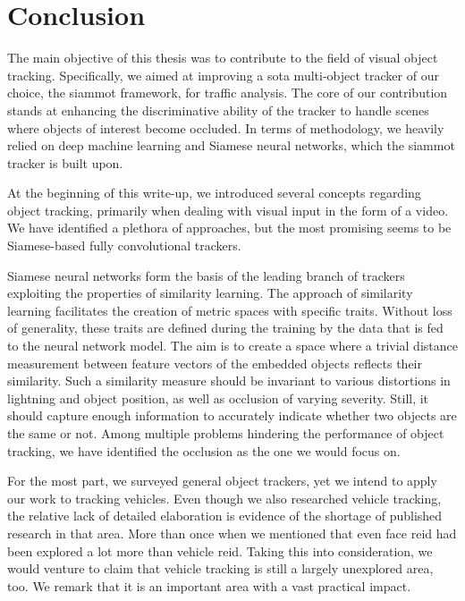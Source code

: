 \chapter{Conclusion}
\label{chap:Conclusion}


The main objective of this thesis was to contribute to the field of visual object tracking. Specifically, we aimed at improving a \gls{sota} multi-object tracker of our choice, the \gls{siammot} framework, for traffic analysis. The core of our contribution stands at enhancing the discriminative ability of the tracker to handle scenes where objects of interest become occluded. In terms of methodology, we heavily relied on deep machine learning and Siamese neural networks, which the \gls{siammot} tracker is built upon.

At the beginning of this write-up, we introduced several concepts regarding object tracking, primarily when dealing with visual input in the form of a video. We have identified a plethora of approaches, but the most promising seems to be Siamese-based fully convolutional trackers.

Siamese neural networks form the basis of the leading branch of trackers exploiting the properties of similarity learning. The approach of similarity learning facilitates the creation of metric spaces with specific traits. Without loss of generality, these traits are defined during the training by the data that is fed to the neural network model. The aim is to create a space where a trivial distance measurement between feature vectors of the embedded objects reflects their similarity. Such a similarity measure should be invariant to various distortions in lightning and object position, as well as occlusion of varying severity. Still, it should capture enough information to accurately indicate whether two objects are the same or not. Among multiple problems hindering the performance of object tracking, we have identified the occlusion as the one we would focus on.

For the most part, we surveyed general object trackers, yet we intend to apply our work to tracking vehicles. Even though we also researched vehicle tracking, the relative lack of detailed elaboration is evidence of the shortage of published research in that area. More than once when we mentioned that even face \gls{reid} had been explored a lot more than vehicle \gls{reid}. Taking this into consideration, we would venture to claim that vehicle tracking is still a largely unexplored area, too. We remark that it is an important area with a vast practical impact.

